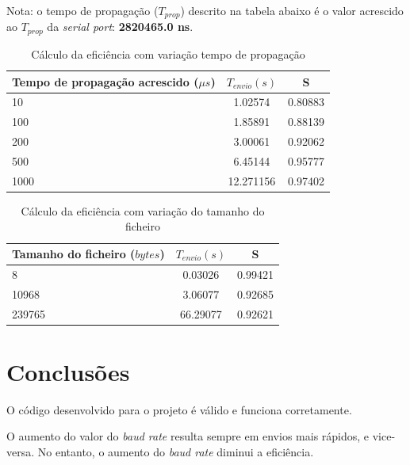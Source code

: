 \documentclass[11pt]{report}
\begin{document}
Nota: o tempo de propagação ($T_{prop}$) descrito na tabela abaixo é o valor
acrescido ao $T_{prop}$ da \textit{serial port}: \textbf{2820465.0 ns}.
\begin{table}[h!]
  \begin{center}
    \caption{Cálculo da eficiência com variação tempo de propagação}
    \label{tab:table1}
    \begin{tabular}{l|c|c} %
        Tempo de propagação acrescido ($\mu s$) & \textbf{$  T_{envio} (s) $} & S \\
      \hline
        10 & 1.02574 & 0.80883\\
        100 & 1.85891 & 0.88139\\
        200 & 3.00061 & 0.92062\\
        500 & 6.45144 & 0.95777\\
        1000 & 12.271156 & 0.97402\\
    \end{tabular}
  \end{center}
\end{table}

\begin{table}[h!]
  \begin{center}
    \caption{Cálculo da eficiência com variação do tamanho do ficheiro}
    \label{tab:table1}
    \begin{tabular}{l|c|c} %
        Tamanho do ficheiro ($bytes$) & \textbf{$  T_{envio} (s) $} & S\\
      \hline
        8 & 0.03026 & 0.99421\\
        10968 & 3.06077 & 0.92685\\
        239765 & 66.29077 & 0.92621\\
    \end{tabular}
  \end{center}
\end{table}

{\let\clearpage\relax \chapter{Conclusões}}

O código desenvolvido para o projeto é válido e funciona corretamente.

O aumento do valor do \textit{baud rate} resulta sempre em envios mais rápidos,
e vice-versa. No entanto, o aumento do \textit{baud rate} diminui a eficiência.
\end{document}
